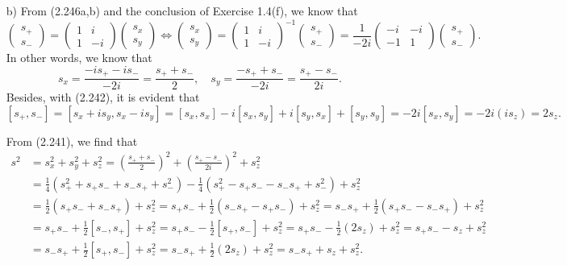 \documentclass[a4paper]{book}
\newcounter{solution}[chapter]
\begin{document}
\begin{solution}
\begin{itemize}
	\item[b)] From (2.246a,b) and the conclusion of Exercise 1.4(f), we know that
	\[
		\begin{pmatrix}
			s_+ \\ s_- 
		\end{pmatrix} = \begin{pmatrix}
			1 & i \\
			1 & -i
		\end{pmatrix} \begin{pmatrix}
			s_x \\ s_y
		\end{pmatrix} \Leftrightarrow \begin{pmatrix}
			s_x \\ s_y
		\end{pmatrix} = \begin{pmatrix}
			1 & i \\
			1 & -i
		\end{pmatrix}^{-1} \begin{pmatrix} 
			s_+ \\ s_- 
		\end{pmatrix} = \frac{1}{-2i} \begin{pmatrix}
			-i & -i \\
			-1 & 1
		\end{pmatrix} \begin{pmatrix} 
			s_+ \\ s_- 
		\end{pmatrix} .
	\]
	In other words, we know that
	\[
		s_x = \frac{ -i s_+ -i s_- }{-2i} = \frac{ s_+ + s_- }{2} , \quad s_y = \frac{ - s_+ + s_- }{-2i} = \frac{ s_+ - s_- }{2i} .
	\]
	Besides, with (2.242), it is evident that
	\[
		[ s_+ , s_- ] = [ s_x + i s_y , s_x - i s_y ] = [ s_x , s_x ] - i [ s_x , s_y ] + i [ s_y , s_x ] + [ s_y , s_y ] = -2i [ s_x , s_y ] = -2i ( is_z ) = 2 s_z .
	\]
	
	From (2.241), we find that
	\begin{align*}
		s^2 &= s^2_x + s^2_y + s^2_z = \left( \frac{ s_+ + s_- }{2} \right)^2 + \left( \frac{ s_+ - s_- }{2i} \right)^2 + s^2_z \\
		&= \frac{1}{4} \left( s^2_+ + s_+ s_- + s_- s_+ + s^2_- \right) - \frac{1}{4} \left( s^2_+ - s_+ s_- - s_- s_+ + s^2_- \right) + s^2_z \\
		&= \frac{1}{2} \left( s_+ s_- + s_- s_+ \right) + s^2_z = s_+ s_- + \frac{1}{2} \left( s_- s_+ -  s_+ s_- \right) + s^2_z = s_- s_+ + \frac{1}{2} \left( s_+ s_- -  s_- s_+ \right) + s^2_z \\
		&= s_+ s_- + \frac{1}{2} [ s_- , s_+ ] + s^2_z = s_+ s_- - \frac{1}{2} [ s_+ , s_- ] + s^2_z = s_+ s_- - \frac{1}{2} (2s_z) + s^2_z =  s_+ s_- - s_z + s^2_z \\
		&= s_- s_+ + \frac{1}{2} [ s_+ , s_- ] + s^2_z = s_- s_+ + \frac{1}{2}(2s_z) + s^2_z =  s_- s_+ + s_z + s^2_z .
	\end{align*}

	\end{itemize}		
	
	\end{solution}
	
\end{document}
